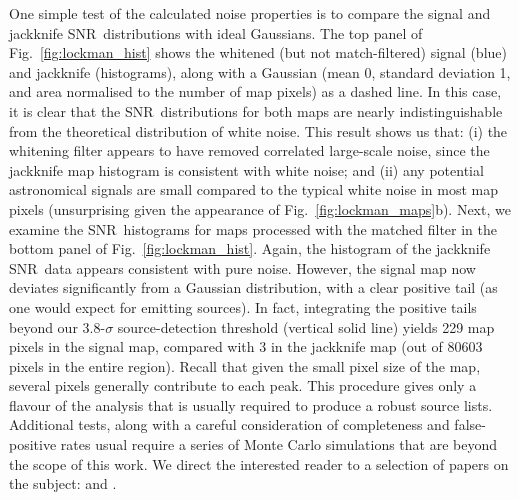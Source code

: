 \documentclass[useAMS,usenatbib,nofootinbib]{mn2e}
\newcommand{\snr}{SNR}
\begin{document}
One simple test of the calculated noise properties is to compare the
signal and jackknife \snr\ distributions with ideal Gaussians. The top
panel of Fig.~\ref{fig:lockman_hist} shows the whitened (but not
match-filtered) signal (blue) and jackknife (histograms), along with a
Gaussian (mean 0, standard deviation 1, and area normalised to the
number of map pixels) as a dashed line. In this case, it is clear that
the \snr\ distributions for both maps are nearly indistinguishable
from the theoretical distribution of white noise. This result shows us
that: (i) the whitening filter appears to have removed correlated
large-scale noise, since the jackknife map histogram is consistent
with white noise; and (ii) any potential astronomical signals are
small compared to the typical white noise in most map pixels
(unsurprising given the appearance of
Fig.~\ref{fig:lockman_maps}b). Next, we examine the \snr\ histograms
for maps processed with the matched filter in the bottom panel of
Fig.~\ref{fig:lockman_hist}. Again, the histogram of the jackknife
\snr\ data appears consistent with pure noise. However, the signal map
now deviates significantly from a Gaussian distribution, with a clear
positive tail (as one would expect for emitting sources). In fact,
integrating the positive tails beyond our 3.8-$\sigma$
source-detection threshold (vertical solid line) yields 229 map pixels
in the signal map, compared with 3 in the jackknife map (out of 80603
pixels in the entire region). Recall that given the small pixel size
of the map, several pixels generally contribute to each peak. This
procedure gives only a flavour of the analysis that is usually
required to produce a robust source lists. Additional tests, along
with a careful consideration of completeness and false-positive rates
usual require a series of Monte Carlo simulations that are beyond the
scope of this work. We direct the interested reader to a selection of
papers on the subject:
\citet{scott2002,coppin2006,perera2008,2009ApJ...707.1201W} and
\citet{chapin2011}.
\end{document}
